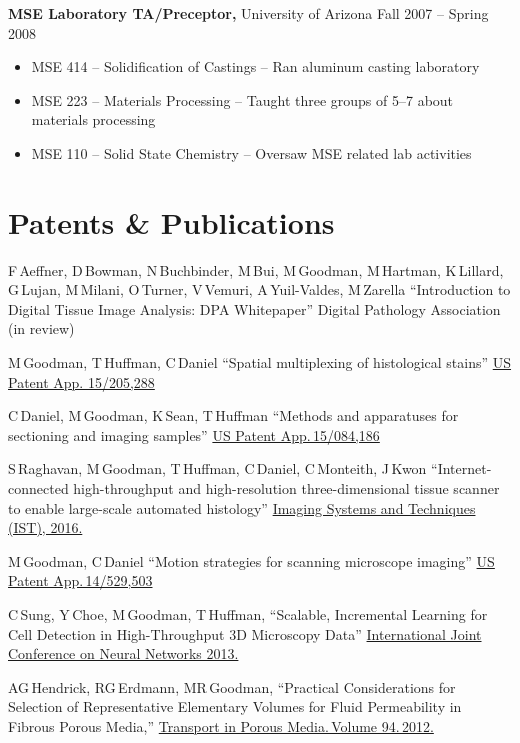 \documentclass{res}
\begin{document}
\begin{resume}
{\bf MSE Laboratory TA/Preceptor,} University of Arizona \hfill Fall 2007 -- Spring 2008
\begin{itemize} \itemsep -2pt
  \item MSE 414 -- Solidification of Castings -- Ran aluminum casting laboratory
  \item MSE 223 -- Materials Processing -- Taught three groups of 5--7 about materials processing
  \item MSE 110 -- Solid State Chemistry -- Oversaw MSE related lab activities
\end{itemize}

\section{Patents \& Publications}

  F\,Aeffner, D\,Bowman, N\,Buchbinder, M\,Bui, M\,Goodman, M\,Hartman, K\,Lillard,
  G\,Lujan, M\,Milani, O\,Turner, V\,Vemuri, A\,Yuil-Valdes, M\,Zarella
  ``Introduction to Digital Tissue Image Analysis: DPA Whitepaper''
  Digital Pathology Association (in review)

  M\,Goodman, T\,Huffman, C\,Daniel
  ``Spatial multiplexing of histological stains''
  \href{https://patents.google.com/patent/US20170011511A1/en}{US Patent App. 15/205,288}

  C\,Daniel, M\,Goodman, K\,Sean, T\,Huffman
  ``Methods and apparatuses for sectioning and imaging samples''
  \href{https://patents.google.com/patent/US20160290895A1/en}{US Patent App.\,15/084,186}

  S\,Raghavan, M\,Goodman, T\,Huffman, C\,Daniel, C\,Monteith, J\,Kwon
  ``Internet-connected high-throughput and high-resolution three-dimensional tissue scanner to
  enable large-scale automated histology''
  \href{https://doi.org/10.1109/IST.2016.7738254}{Imaging Systems and Techniques (IST), 2016.}

  M\,Goodman, C\,Daniel
  ``Motion strategies for scanning microscope imaging''
  \href{https://patents.google.com/patent/US20150138532A1/en}{US Patent App.\,14/529,503}

  C\,Sung, Y\,Choe, M\,Goodman, T\,Huffman,
  ``Scalable, Incremental Learning for Cell Detection in High-Throughput 3D Microscopy Data''
  \href{https://doi.org/10.1109/IJCNN.2013.6706769}{International Joint Conference on Neural Networks 2013.}

  AG\,Hendrick, RG\,Erdmann, MR\,Goodman,
  ``Practical Considerations for Selection of Representative
  Elementary Volumes for Fluid Permeability in Fibrous Porous Media,''
  \href{http://dx.doi.org/10.1007/s11242-012-0051-8}{Transport in Porous Media.\,Volume 94.\,2012.}


\end{resume}
\end{document}
